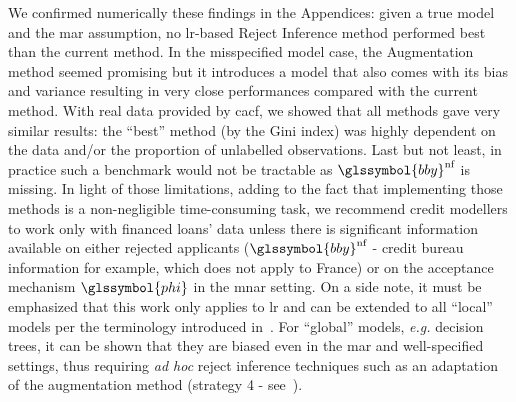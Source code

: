 We confirmed numerically these findings in the Appendices: given a true model and the \gls{mar} assumption, no \gls{lr}-based {Reject Inference} method performed best than the current method. In the misspecified model case, the Augmentation method seemed promising but it introduces a model that also comes with its bias and variance resulting in very close performances compared with the current method. With real data provided by \gls{cacf}, we showed that all methods gave very similar results: the ``best'' method (by the Gini index) was highly dependent on the data and/or the proportion of unlabelled observations. Last but not least, in practice such a benchmark would not be tractable as $\glssymbol{bby}^{\text{nf}}$ is missing. In light of those limitations, adding to the fact that implementing those methods is a non-negligible time-consuming task, we recommend credit modellers to work only with financed loans' data unless there is significant information available on either rejected applicants ($\glssymbol{bby}^{\text{nf}}$ - credit bureau information for example, which does not apply to France) or on the acceptance mechanism $\glssymbol{phi}$ in the \gls{mnar} setting. On a side note, it must be emphasized that this work only applies to \gls{lr} and can be extended to all ``local'' models per the terminology introduced in~\cite{zadrozny2004learning}. For ``global'' models, \textit{e.g.} decision trees, it can be shown that they are biased even in the \gls{mar} and well-specified settings, thus requiring \textit{ad hoc} reject inference techniques such as an adaptation of the augmentation method (strategy 4 - see~\cite{zadrozny2004learning}).

\printbibliography[heading=subbibliography, title=References of Chapter 2]